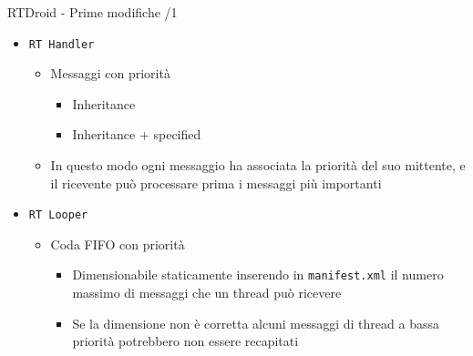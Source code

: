 \begin{frame}{RTDroid - Prime modifiche /1}
	\begin{itemize}
		\item \texttt{RT Handler}
		\begin{itemize}
			\item Messaggi con priorità
			\begin{itemize}
				\item Inheritance
				\item Inheritance + specified
			\end{itemize}
		\item In questo modo ogni messaggio ha associata la priorità del suo mittente, e il ricevente può processare prima i messaggi più importanti
		\end{itemize}
		\item \texttt{RT Looper}
		\begin{itemize}
			\item Coda FIFO con priorità
			\begin{itemize}
				\item Dimensionabile staticamente inserendo in \texttt{manifest.xml} il numero massimo di messaggi che un thread può ricevere
				\item Se la dimensione non è corretta alcuni messaggi di thread a bassa priorità potrebbero non essere recapitati
			\end{itemize}
		\end{itemize}
	\end{itemize}
\end{frame}
